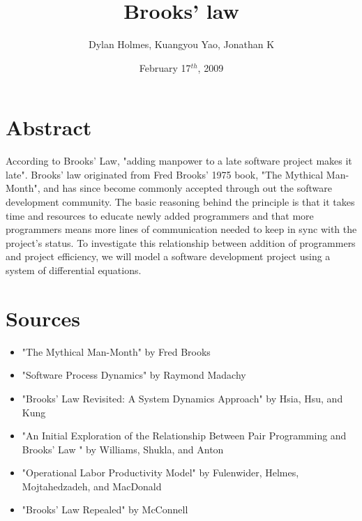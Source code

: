 \documentclass{article}
\author{Dylan Holmes, Kuangyou Yao, Jonathan K
}
\title{Brooks' law}
\date{February 17$^{th}$, 2009}
\begin{document}
\maketitle



\section*{Abstract}
According to Brooks' Law, "adding manpower to a late software project makes it late". Brooks' law originated from Fred Brooks' 1975 book, "The Mythical Man-Month", and has since become commonly accepted through out the software development community. The basic reasoning behind the principle is that it takes time and resources to educate newly added programmers and that more programmers means more lines of communication needed to keep in sync with the project's status. To investigate this relationship between addition of programmers and project efficiency, we will model a software development project using a system of differential equations.

\section*{Sources}
\begin{itemize}
    \item "The Mythical Man-Month" by Fred Brooks
    \item "Software Process Dynamics" by Raymond Madachy
    \item "Brooks’ Law Revisited: A System Dynamics Approach" by Hsia, Hsu, and Kung
    \item "An Initial Exploration of the Relationship Between Pair Programming and Brooks’ Law
" by Williams, Shukla, and Anton
    \item "Operational Labor Productivity Model" by Fulenwider, Helmes, Mojtahedzadeh, and MacDonald
    \item "Brooks’ Law Repealed" by McConnell
\end{itemize}
\end{document}
